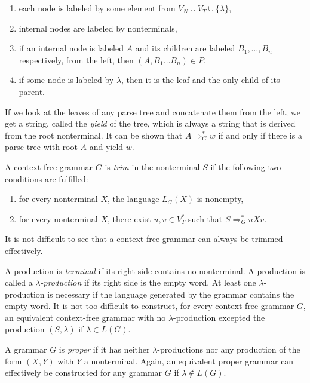\begin{enumerate}
\item each node is labeled by some element from $V_N \cup V_T \cup \{\lambda\}$,
\item internal nodes are labeled by nonterminals,
\item if an internal node is labeled $A$ and its children are labeled $B_1, \ldots, B_n$ respectively, from the left, then $(A, B_1 \ldots B_n) \in P$,
\item if some node is labeled by $\lambda$, then it is the leaf and the only child of its parent.
\end{enumerate}

If we look at the leaves of any parse tree and concatenate them from the left, we get a string, called the \emph{yield} of the tree, which is always a string that is derived from the root nonterminal. It can be shown that $A \Rightarrow^*_G w$ if and only if there is a parse tree with root $A$ and yield $w$.

A context-free grammar $G$ is \emph{trim} in the nonterminal $S$ if the following two conditions are fulfilled:

\begin{enumerate}
\item for every nonterminal $X$, the language $L_G(X)$ is nonempty,
\item for every nonterminal $X$, there exist $u, v \in V_T^*$ such that $S \Rightarrow^*_G uXv$.
\end{enumerate}

It is not difficult to see that a context-free grammar can always be trimmed effectively.

A production is \emph{terminal} if its right side contains no nonterminal. A production is called a  \emph{$\lambda$-production} if its right side is the empty word. At least one $\lambda$-production is necessary if the language generated by the grammar contains the empty word. It is not too difficult to construct, for every context-free grammar $G$, an equivalent context-free grammar with no $\lambda$-production excepted the production $(S, \lambda)$ if $\lambda \in L(G)$.

A grammar $G$ is \emph{proper} if it has neither $\lambda$-productions nor any production of the form $(X, Y)$ with $Y$ a nonterminal. Again, an equivalent proper grammar can effectively be constructed for any grammar $G$ if $\lambda \notin L(G)$.

